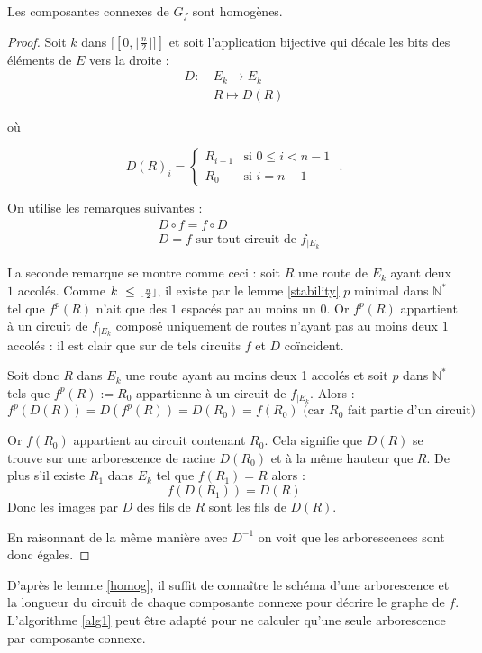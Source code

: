 \begin{lem}\label{homog}
Les composantes connexes de $G_f$ sont homog\`enes.
\end{lem}
\begin{proof}
Soit $k$ dans $[\![0,\scriptstyle\lfloor\frac{n}{2}\rfloor\textstyle]\!]$ et soit l'application bijective qui d\'ecale les bits des \'el\'ements de $E$ vers la droite :
\begin{align*}
D:\ &E_{k}\rightarrow E_{k}\\&R\mapsto D(R)
\end{align*}

o\`u

\[D(R)_{i}=\begin{cases}
R_{i+1} &\text{si }0\leq i<n-1\\
R_{0} &\text{si }i=n-1
\end{cases}\text{ .}\]\par

On utilise les remarques suivantes :
\begin{align*}
&D\circ f = f\circ D\\
&D = f \text{ sur tout circuit de }f_{|E_k}
\end{align*}

La seconde remarque se montre comme ceci : soit $R$ une route de $E_k$ ayant deux $1$ accol\'es. Comme $k\ \leq\ \scriptstyle\lfloor\frac{n}{2}\rfloor\textstyle$, il existe par le lemme \ref{stability} $p$ minimal dans $\mathbb{N}^*$ tel que $f^{p}(R)$ n'ait que des $1$ espac\'es par au moins un $0$. Or $f^{p}(R)$ appartient \`a un circuit de $f_{|E_k}$ compos\'e uniquement de routes n'ayant pas au moins deux $1$ accol\'es : il est clair que sur de tels circuits $f$ et $D$ co\"incident.

Soit donc $R$  dans $E_k$ une route ayant au moins deux 1 accol\'es et soit $p$ dans $\mathbb{N}^*$ tels que $f^{p}(R):=R_0$ appartienne \`a un circuit de $f_{|E_{k}}$. Alors :
\[f^{p}(D(R))=D(f^{p}(R))=D(R_{0})=f(R_{0})\text{ (car }R_0\text{ fait partie d'un circuit)}\]

Or $f(R_{0})$ appartient au circuit contenant $R_0$. Cela signifie que $D(R)$ se trouve sur une arborescence de racine $D(R_{0})$ et \`a la m\^eme hauteur que $R$. De plus s'il existe $R_1$ dans $E_k$ tel que $f(R_{1})=R$ alors :
\[f(D(R_{1}))=D(R)\]
Donc les images par $D$ des \og fils \fg{} de $R$ sont les \og fils \fg{} de $D(R)$.\par
En raisonnant de la m\^eme mani\`ere avec $D^{-1}$ on voit que les arborescences sont donc \'egales.
\end{proof}

\begin{csq}
D'apr\`es le lemme \ref{homog}, il suffit de conna\^itre le sch\'ema d'une arborescence et la longueur du circuit de chaque composante connexe pour d\'ecrire le graphe de $f$. L'algorithme \ref{alg1} peut \^etre adapt\'e pour ne calculer qu'une seule arborescence par composante connexe.
\end{csq}